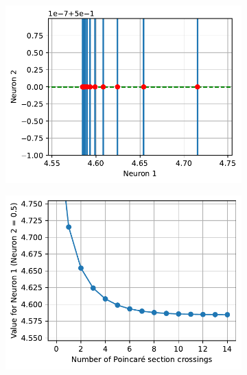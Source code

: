 \documentclass{cmc}
\begin{document}
\begin{figure}[H]
  \centering
  \begin{subfigure}[b]{0.49\textwidth}
    { \centering
      \includegraphics[width=\textwidth]{figures/Case3_cross_phase_zoom} }
    \caption{}
  \end{subfigure}
  \begin{subfigure}[b]{0.49\textwidth}
    { \centering \includegraphics[width=\textwidth]{figures/Case3_cross} }
    \caption{}
  \end{subfigure}
  \caption{}
  \label{fig:stable-unstable-cycle-poincare-analysis}
\end{figure}
\end{document}
